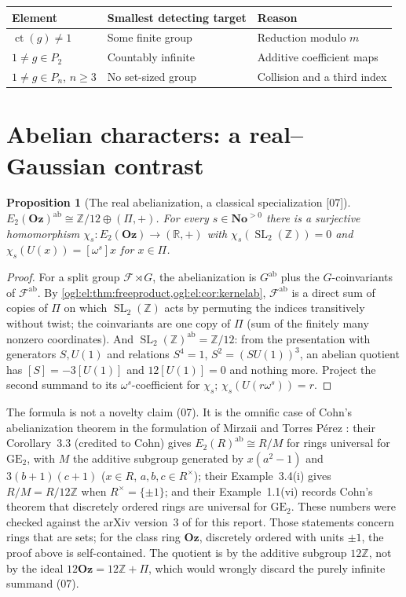 \documentclass[11pt,oneside]{article}
\numberwithin{equation}{section}
\newtheorem{proposition}[proposition]{Proposition}
\theoremstyle{definition}
\theoremstyle{remark}
\newcommand{\No}{\mathbf{No}}
\newcommand{\Oz}{\mathbf{Oz}}
\newcommand{\Z}{\mathbb Z}
\newcommand{\R}{\mathbb R}
\newcommand{\cF}{\mathcal F}
\newcommand{\ct}{\operatorname{ct}}
\newcommand{\SL}{\operatorname{SL}}
\newcommand{\ab}{\mathrm{ab}}
\newcommand{\coeff}[2]{[\omega^{#1}]#2}
\newcommand{\src}[1]{\textup{\textsf{\small[#1]}}}
\begin{document}
\begin{center}
\renewcommand{\arraystretch}{1.15}
\begin{tabular}{>{\raggedright\arraybackslash}p{}>{\raggedright\arraybackslash}p{}>{\raggedright\arraybackslash}p{}}
\toprule
Element & Smallest detecting target & Reason\\
\midrule
$\ct(g)\ne1$ & Some finite group & Reduction modulo $m$\\
$1\ne g\in P_2$ & Countably infinite & Additive coefficient maps\\
$1\ne g\in P_n$, $n\ge3$ & No set-sized group & Collision and a third index\\
\bottomrule
\end{tabular}
\end{center}

\section{Abelian characters: a real--Gaussian contrast}\label{ogl:el:sec:abelian}

\begin{proposition}[The real abelianization, a classical specialization \src{07}]\label{ogl:el:prop:realab}
$E_2(\Oz)^{\ab}\cong\Z/12\oplus(\Pi,+)$. For every $s\in\No^{>0}$ there is a
surjective homomorphism $\chi_s:E_2(\Oz)\to(\R,+)$ with $\chi_s(\SL_2(\Z))=0$ and
$\chi_s(U(x))=\coeff{s}{x}$ for $x\in\Pi$.
\end{proposition}
\begin{proof}
For a split group $\cF\rtimes G$, the abelianization is $G^{\ab}$ plus the
$G$-coinvariants of $\cF^{\ab}$. By
\cref{ogl:el:thm:freeproduct,ogl:el:cor:kernelab}, $\cF^{\ab}$ is a direct sum
of copies of $\Pi$ on which $\SL_2(\Z)$ acts by permuting the indices
transitively without twist; the coinvariants are one copy of $\Pi$ (sum of the
finitely many nonzero coordinates). And $\SL_2(\Z)^{\ab}=\Z/12$: from the
presentation with generators $S,U(1)$ and relations $S^4=1$, $S^2=(SU(1))^3$,
an abelian quotient has $[S]=-3[U(1)]$ and $12[U(1)]=0$ and nothing more.
Project the second summand to its $\omega^s$-coefficient for $\chi_s$;
$\chi_s(U(r\omega^s))=r$.
\end{proof}

The formula is not a novelty claim (07). It is the omnific case of Cohn's
abelianization theorem \cite{Cohn} in the formulation of Mirzaii and Torres
P\'erez \cite{MirzaiiTorres}: their Corollary~3.3 (credited to Cohn) gives
$E_2(R)^{\ab}\cong R/M$ for rings universal for $\mathrm{GE}_2$, with $M$ the
additive subgroup generated by $x(a^2-1)$ and $3(b+1)(c+1)$ ($x\in R$,
$a,b,c\in R^\times$); their Example~3.4(i) gives $R/M=R/12\Z$ when
$R^\times=\{\pm1\}$; and their Example~1.1(vi) records Cohn's theorem that
discretely ordered rings are universal for $\mathrm{GE}_2$. These numbers
were checked against the arXiv version~3 of \cite{MirzaiiTorres} for this
report. Those statements concern rings that are sets; for the class ring $\Oz$,
discretely ordered with units $\pm1$, the proof above is self-contained. The
quotient is by the additive subgroup $12\Z$, not by the ideal $12\Oz=12\Z+\Pi$,
which would wrongly discard the purely infinite summand (07).
\end{document}
